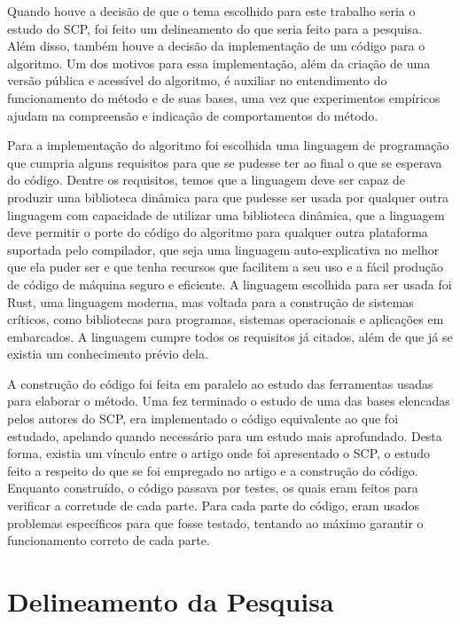 Quando houve a decisão de que o tema escolhido para este trabalho seria o estudo do SCP, foi feito um delineamento do que seria feito para a pesquisa. Além disso, também houve a decisão da implementação de um código para o algoritmo. Um dos motivos para essa implementação, além da criação de uma versão pública e acessível do algoritmo, é auxiliar no entendimento do funcionamento do método e de suas bases, uma vez que experimentos empíricos ajudam na compreensão e indicação de comportamentos do método.

Para a implementação do algoritmo foi escolhida uma linguagem de programação que cumpria alguns requisitos para que se pudesse ter ao final o que se esperava do código. Dentre os requisitos, temos que a linguagem deve ser capaz de produzir uma biblioteca dinâmica para que pudesse ser usada por qualquer outra linguagem com capacidade de utilizar uma biblioteca dinâmica, que a linguagem deve permitir o porte do código do algoritmo para qualquer outra plataforma suportada pelo compilador, que seja uma linguagem auto-explicativa no melhor que ela puder ser e que tenha recursos que facilitem a seu uso e a fácil produção de código de máquina seguro e eficiente. A linguagem escolhida para ser usada foi Rust, uma linguagem moderna, mas voltada para a construção de sistemas críticos, como bibliotecas para programas, sistemas operacionais e aplicações em embarcados. A linguagem cumpre todos os requisitos já citados, além de que já se existia um conhecimento prévio dela.

A construção do código foi feita em paralelo ao estudo das ferramentas usadas para elaborar o método. Uma fez terminado o estudo de uma das bases elencadas pelos autores do SCP, era implementado o código equivalente ao que foi estudado, apelando quando necessário para um estudo mais aprofundado. Desta forma, existia um vínculo entre o artigo onde foi apresentado o SCP, o estudo feito a respeito do que se foi empregado no artigo e a construção do código. Enquanto construído, o código passava por testes, os quais eram feitos para verificar a corretude de cada parte. Para cada parte do código, eram usados problemas específicos para que fosse testado, tentando ao máximo garantir o funcionamento correto de cada parte.

\section{Delineamento da Pesquisa}
\label{sec:titSecDelPesq}




